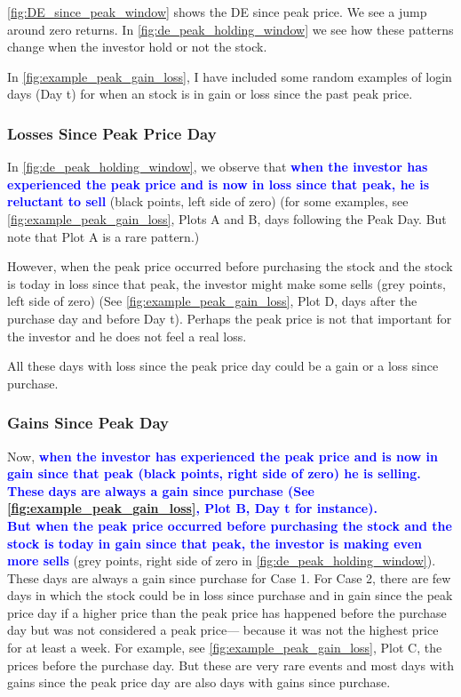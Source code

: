 \ref{fig:DE_since_peak_window} shows the DE since peak price. We see a jump around zero returns. In \ref{fig:de_peak_holding_window} we see how these patterns change when the investor hold or not the stock.

In \ref{fig:example_peak_gain_loss}, I have included some random examples of login days (Day t) for when an stock is in gain or loss since the past peak price. 

\subsubsection{Losses Since Peak Price Day} 
In \ref{fig:de_peak_holding_window}, we observe that \textcolor{blue}{\textbf{when the investor has experienced the peak price and is now in loss since that peak, he is reluctant to sell}} (black points, left side of zero) (for some examples, see \ref{fig:example_peak_gain_loss}, Plots A and B, days following the Peak Day. But note that Plot A is a rare pattern.) 

However, when the peak price occurred before purchasing the stock and the stock is today in loss since that peak, the investor might make some sells (grey points, left side of zero) (See \ref{fig:example_peak_gain_loss}, Plot D, days after the purchase day and before Day t). Perhaps the peak price is not that important for the investor and he does not feel a real loss. 

All these days with loss since the peak price day could be a gain or a loss since purchase. 

\subsubsection{Gains Since Peak Day} 
Now, \textcolor{blue}{\textbf{when the investor has experienced the peak price and is now in gain since that peak (black points, right side of zero) he is selling. These days are always a gain since purchase (See \ref{fig:example_peak_gain_loss}, Plot B, Day t for instance). \\
But when the peak price occurred before purchasing the stock and the stock is today in gain since that peak, the investor is making even more sells}} (grey points, right side of zero in \ref{fig:de_peak_holding_window}). These days are always a gain since purchase for Case 1. For Case 2, there are few days in which the stock could be in loss since purchase and in gain since the peak price day if a higher price than the peak price has happened before the purchase day but was not considered a peak price--- because it was not the highest price for at least a week. For example, see \ref{fig:example_peak_gain_loss}, Plot C, the prices before the purchase day. But these are very rare events and most days with gains since the peak price day are also days with gains since purchase. 


